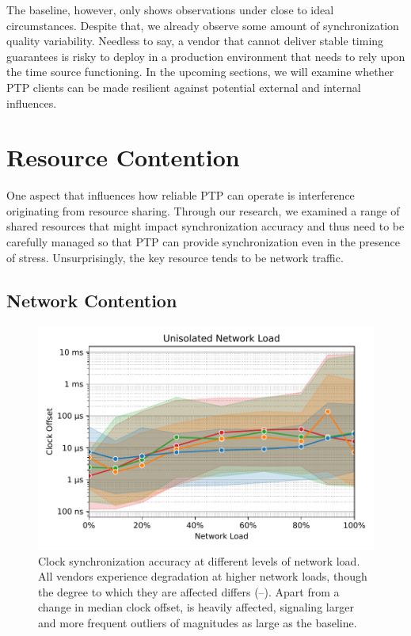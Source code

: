 {The baseline, however, only shows observations under close to ideal circumstances. Despite that, we already observe some amount of synchronization quality variability.
Needless to say, a vendor that cannot deliver stable timing guarantees is risky to deploy in a production environment that needs to rely upon the time source functioning. In the upcoming sections, we will examine whether PTP clients can be made resilient against potential external and internal influences.

}

\section{Resource Contention}
\label{sec:resource_contention}

One aspect that influences how reliable PTP can operate is interference originating from resource sharing. Through our research, we examined a range of shared resources that might impact synchronization accuracy and thus need to be carefully managed so that PTP can provide synchronization even in the presence of stress. Unsurprisingly, the key resource tends to be network traffic.

\subsection{Network Contention}

\begin{figure}
    \centering
    \includegraphics[width=\linewidth]{res/generated/net_unprioritized_trend_rpi-4.pdf}
    \legend
    \caption{Clock synchronization accuracy at different levels of network load. All vendors experience degradation at higher network loads, though the degree to which they are affected differs (\fRatio{\cmpMin}--\fRatio{\cmpMax}). Apart from a change in median clock offset, \PNineFive{} is heavily affected, signaling larger and more frequent outliers of magnitudes \fRatio[-1]{\cmpMax} as large as the baseline.}
    \label{fig:network_load}
\end{figure}


